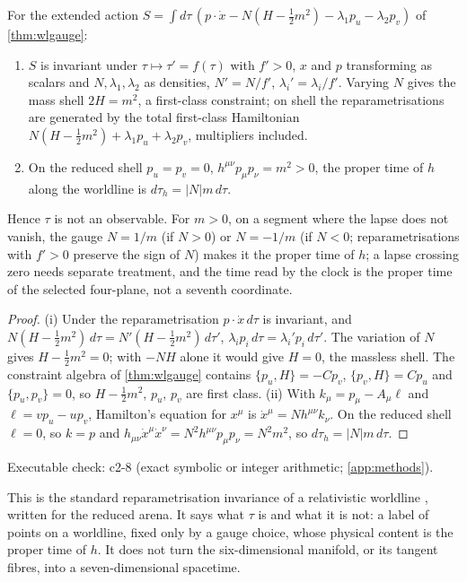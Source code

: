 \begin{proposition}
\label{prop:wltau}
For the extended action $S=\int d\tau\,(p\cdot\dot x-N(H-\tfrac12m^2)-\lambda_1p_u-\lambda_2p_v)$ of \cref{thm:wlgauge}:
\begin{enumerate}[label=(\roman*),leftmargin=2.2em]
\item $S$ is invariant under $\tau\mapsto\tau'=f(\tau)$ with $f'>0$, $x$ and $p$ transforming as scalars and $N,\lambda_1,\lambda_2$ as densities,
$N'=N/f'$, $\lambda_i'=\lambda_i/f'$. Varying $N$ gives the mass shell $2H=m^2$, a first-class constraint; on shell the reparametrisations are
generated by the total first-class Hamiltonian $N(H-\tfrac12m^2)+\lambda_1p_u+\lambda_2p_v$, multipliers included.
\item On the reduced shell $p_u=p_v=0$, $h^{\mu\nu}p_\mu p_\nu=m^2>0$, the proper time of $h$ along the worldline is $d\tau_h=|N|m\,d\tau$.
\end{enumerate}
Hence $\tau$ is not an observable. For $m>0$, on a segment where the lapse does not vanish, the gauge $N=1/m$ (if $N>0$) or $N=-1/m$
(if $N<0$; reparametrisations with $f'>0$ preserve the sign of $N$) makes it the proper time of $h$; a lapse crossing zero needs separate treatment, and the time read by the clock is the proper time of the
selected four-plane, not a seventh coordinate.
\end{proposition}

\begin{proof}
(i) Under the reparametrisation $p\cdot\dot x\,d\tau$ is invariant, and $N(H-\tfrac12m^2)\,d\tau=N'(H-\tfrac12m^2)\,d\tau'$, $\lambda_ip_i\,d\tau=\lambda_i'p_i\,d\tau'$.
The variation of $N$ gives $H-\tfrac12m^2=0$; with $-NH$ alone it would give $H=0$, the massless shell. The constraint
algebra of \cref{thm:wlgauge} contains $\{p_u,H\}=-Cp_v$, $\{p_v,H\}=Cp_u$ and $\{p_u,p_v\}=0$, so $H-\tfrac12m^2$, $p_u$, $p_v$ are first class. (ii) With
$k_\mu=p_\mu-A_\mu\ell$ and $\ell=vp_u-up_v$, Hamilton's equation for $x^\mu$ is $\dot x^\mu=Nh^{\mu\nu}k_\nu$. On the reduced shell $\ell=0$, so $k=p$ and
$h_{\mu\nu}\dot x^\mu\dot x^\nu=N^2h^{\mu\nu}p_\mu p_\nu=N^2m^2$, so $d\tau_h=|N|m\,d\tau$.
\end{proof}

\noindent Executable check: c2-8 (exact symbolic or integer arithmetic; \cref{app:methods}).

This is the standard reparametrisation invariance of a relativistic worldline \cite{HenneauxTeitelboim92}, written for the reduced arena. It
says what $\tau$ is and what it is not: a label of points on a worldline, fixed only by a gauge choice, whose physical content is the proper
time of $h$. It does not turn the six-dimensional manifold, or its tangent fibres, into a seven-dimensional spacetime.

